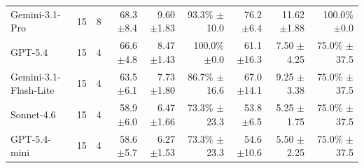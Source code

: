 \begin{table}[t]
\begin{tabular*}{\textwidth}{@{\extracolsep{\fill}}lrrrrrrrr@{}}
Gemini-3.1-Pro & 15 & 8 & \shortstack[r]{68.3\\{\scriptsize $\pm$8.4}} & \shortstack[r]{9.60\\{\scriptsize $\pm$1.83}} & \shortstack[r]{93.3\%\\{\scriptsize $\pm$10.0}} & \shortstack[r]{76.2\\{\scriptsize $\pm$6.4}} & \shortstack[r]{11.62\\{\scriptsize $\pm$1.88}} & \shortstack[r]{100.0\%\\{\scriptsize $\pm$0.0}} \\
GPT-5.4 & 15 & 4 & \shortstack[r]{66.6\\{\scriptsize $\pm$4.8}} & \shortstack[r]{8.47\\{\scriptsize $\pm$1.43}} & \shortstack[r]{100.0\%\\{\scriptsize $\pm$0.0}} & \shortstack[r]{61.1\\{\scriptsize $\pm$16.3}} & \shortstack[r]{7.50\\{\scriptsize $\pm$4.25}} & \shortstack[r]{75.0\%\\{\scriptsize $\pm$37.5}} \\
Gemini-3.1-Flash-Lite & 15 & 4 & \shortstack[r]{63.5\\{\scriptsize $\pm$6.1}} & \shortstack[r]{7.73\\{\scriptsize $\pm$1.80}} & \shortstack[r]{86.7\%\\{\scriptsize $\pm$16.6}} & \shortstack[r]{67.0\\{\scriptsize $\pm$14.1}} & \shortstack[r]{9.25\\{\scriptsize $\pm$3.38}} & \shortstack[r]{75.0\%\\{\scriptsize $\pm$37.5}} \\
Sonnet-4.6 & 15 & 4 & \shortstack[r]{58.9\\{\scriptsize $\pm$6.0}} & \shortstack[r]{6.47\\{\scriptsize $\pm$1.66}} & \shortstack[r]{73.3\%\\{\scriptsize $\pm$23.3}} & \shortstack[r]{53.8\\{\scriptsize $\pm$6.5}} & \shortstack[r]{5.25\\{\scriptsize $\pm$1.75}} & \shortstack[r]{75.0\%\\{\scriptsize $\pm$37.5}} \\
GPT-5.4-mini & 15 & 4 & \shortstack[r]{58.6\\{\scriptsize $\pm$5.7}} & \shortstack[r]{6.27\\{\scriptsize $\pm$1.53}} & \shortstack[r]{73.3\%\\{\scriptsize $\pm$23.3}} & \shortstack[r]{54.6\\{\scriptsize $\pm$10.6}} & \shortstack[r]{5.50\\{\scriptsize $\pm$2.25}} & \shortstack[r]{75.0\%\\{\scriptsize $\pm$37.5}} \\

\end{tabular*}
\end{table}
